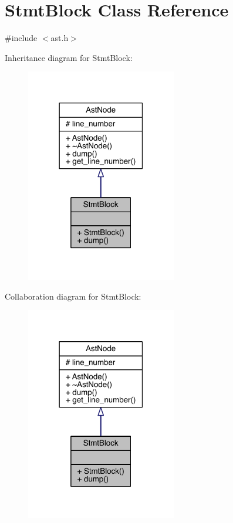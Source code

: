 \hypertarget{class_stmt_block}{}\section{Stmt\+Block Class Reference}
\label{class_stmt_block}


{\ttfamily \#include $<$ast.\+h$>$}



Inheritance diagram for Stmt\+Block\+:\nopagebreak
\begin{figure}[H]
\begin{center}
\leavevmode
\includegraphics[width=186pt]{class_stmt_block__inherit__graph}
\end{center}
\end{figure}


Collaboration diagram for Stmt\+Block\+:\nopagebreak
\begin{figure}[H]
\begin{center}
\leavevmode
\includegraphics[width=186pt]{class_stmt_block__coll__graph}
\end{center}
\end{figure}
